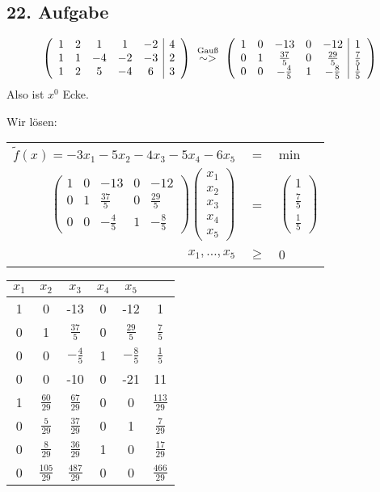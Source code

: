 \documentclass[a4paper,11pt,twoside,titlepage]{article}
\begin{document}
\subsection*{22. Aufgabe}
\[\left(\begin{array}{ccccc|c}
1&2&1&1&-2&4\\
1&1&-4&-2&-3&2\\
1&2&5&-4&6&3
\end{array}\right)
\ \stackrel{\textnormal{\scriptsize{Gauß}}}{\sim>}\ 
\left(\begin{array}{ccccc|c}
1&0&-13&0&-12&1\\
0&1&\frac{37}{5}&0&\frac{29}{5}&\frac{7}{5}\\
0&0&-\frac{4}{5}&1&-\frac{8}{5}&\frac{1}{5}
\end{array}\right)\]
Also ist $x^0$ Ecke.

Wir lösen:
\begin{center}
\begin{tabular}{|rcl|}\hline
$\tilde f(x)=-3x_1-5x_2-4x_3-5x_4-6x_5$&=&min\\
$\left(\begin{array}{ccccc}
1&0&-13&0&-12\\
0&1&\frac{37}{5}&0&\frac{29}{5}\\
0&0&-\frac{4}{5}&1&-\frac{8}{5}
\end{array}\right)\begin{pmatrix}x_1\\x_2\\x_3\\x_4\\x_5\end{pmatrix}$&=&$\begin{pmatrix}1\\ \frac{7}{5}\\ \frac{1}{5}\end{pmatrix}$\\
$x_1,\ldots,x_5$&$\geq$&0\\\hline
\end{tabular}
\end{center}

\begin{tabular}{ccccc|c}
$x_1$&$x_2$&$x_3$&$x_4$&$x_5$&\\\hline
1&0&-13&0&-12&1\\[6pt]
0&1&$\frac{37}{5}$&0&$\frac{29}{5}$&$\frac{7}{5}$\\[6pt]
0&0&$-\frac{4}{5}$&1&$-\frac{8}{5}$&$\frac{1}{5}$\\[6pt]\hline
0&0&-10&0&-21&11\\\hline\hline 
1&$\frac{60}{29}$&$\frac{67}{29}$&0&0&$\frac{113}{29}$\\[6pt]
0&$\frac{5}{29}$&$\frac{37}{29}$&0&1&$\frac{7}{29}$\\[6pt]
0&$\frac{8}{29}$&$\frac{36}{29}$&1&0&$\frac{17}{29}$\\[6pt]\hline
0&$\frac{105}{29}$&$\frac{487}{29}$&0&0&$\frac{466}{29}$
\end{tabular}
\end{document}

